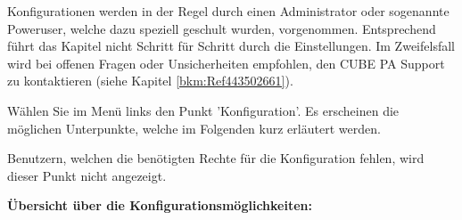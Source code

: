 Konfigurationen werden in der Regel durch einen Administrator oder sogenannte Poweruser, welche dazu speziell geschult wurden, vorgenommen. Entsprechend führt das Kapitel nicht Schritt für Schritt durch die Einstellungen. Im Zweifelsfall wird bei offenen Fragen oder Unsicherheiten empfohlen, den CUBE PA Support zu kontaktieren (siehe Kapitel \ref{bkm:Ref443502661}).

\vspace{\baselineskip}

Wählen Sie im Menü links den Punkt 'Konfiguration'. Es erscheinen die möglichen Unterpunkte, welche im Folgenden kurz erläutert werden.

\vspace{1.5cm} 

Benutzern, welchen die benötigten Rechte für die Konfiguration fehlen, wird dieser Punkt nicht angezeigt.

\vspace{3.5cm}  

\textbf{Übersicht über die Konfigurationsmöglichkeiten:}

\vspace{\baselineskip}

